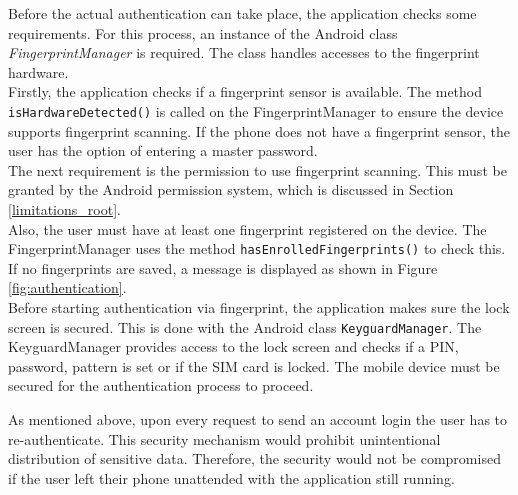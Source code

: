 Before the actual authentication can take place, the application checks some requirements. For this process, an instance of the Android class \textit{FingerprintManager} is required. The class handles accesses to the fingerprint hardware. \cite{FingerprintManager} \\
Firstly, the application checks if a fingerprint sensor is available. The method \texttt{isHardwareDetected()} is called on the FingerprintManager to ensure the device supports fingerprint scanning.  If the phone does not have a fingerprint sensor, the user has the option of entering a master password. \\
The next requirement is the permission to use fingerprint scanning. This must be granted by the Android permission system, which is discussed in Section \ref{limitations_root}. \\
Also, the user must have at least one fingerprint registered on the device. \cite{FingerprintTutorial} The FingerprintManager uses the method \texttt{hasEnrolledFingerprints()} to check this. If no fingerprints are saved, a message is displayed as shown in Figure \ref{fig:authentication}\protect{}. \\
Before starting authentication via fingerprint, the application makes sure the lock screen is secured. This is done with the Android class \texttt{KeyguardManager}. \cite{KeyguardManager} The KeyguardManager provides access to the lock screen and checks if a PIN, password, pattern is set or if the SIM card is locked. The mobile device must be secured for the authentication process to proceed.

As mentioned above, upon every request to send an account login the user has to re-authenticate. This security mechanism would prohibit unintentional distribution of sensitive data. Therefore, the security would not be compromised if the user left their phone unattended with the application still running. \\

